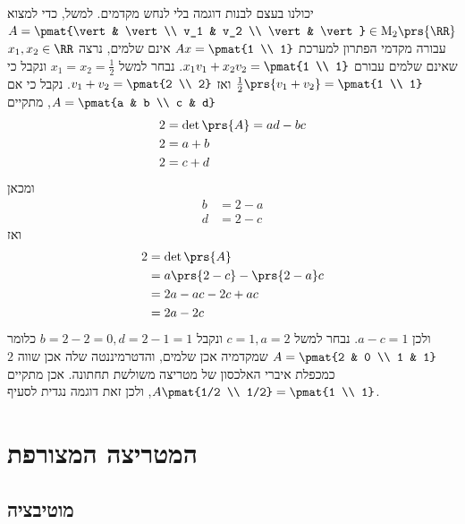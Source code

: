 \documentclass[a4paper,10pt,twoside,openany]{book}
\renewcommand{\Mat}{\mathrm{M}}
\begin{document}
\begin{solution}
\begin{enumerate}
יכולנו בעצם לבנות דוגמה בלי לנחש מקדמים. למשל, כדי למצוא
$A = \pmat{\vert & \vert \\ v_1 & v_2 \\ \vert & \vert} \in \Mat_2\prs{\RR}$
עבורה מקדמי הפתרון למערכת
$Ax = \pmat{1 \\ 1}$
אינם שלמים, נרצה
$x_1, x_2 \in \RR$
שאינם שלמים
עבורם
$x_1 v_1 + x_2 v_2 = \pmat{1 \\ 1}$.
נבחר למשל
$x_1 = x_2 = \frac{1}{2}$
ונקבל כי
$\frac{1}{2} \prs{v_1 + v_2} = \pmat{1 \\ 1}$
ואז
$v_1 + v_2 = \pmat{2 \\ 2}$.
נקבל כי אם
$A = \pmat{a & b \\ c & d}$,
מתקיים
\begin{align*}
2 &= \det\prs{A} = ad - bc \\
2 &= a + b \\
2 &= c + d
\end{align*}
ומכאן
\begin{align*}
b &= 2 - a \\
d &= 2 - c
\end{align*}
ואז
\begin{align*}
2 &= \det\prs{A}
\\&= a \prs{2-c} - \prs{2-a}c
\\&= 2a - ac - 2c + ac
\\&= 2a - 2c
\end{align*}
ולכן
$a-c = 1$.
נבחר למשל
$c = 1, a = 2$
ונקבל
$b = 2 - 2 = 0, d = 2 - 1 = 1$
כלומר
$A = \pmat{2 & 0 \\ 1 & 1}$
שמקדמיה אכן שלמים, והדטרמיננטה שלה אכן שווה
$2$
כמכפלת איברי האלכסון של מטריצה משולשת תחתונה.
אכן מתקיים
$A \pmat{1/2 \\ 1/2} = \pmat{1 \\ 1}$,
ולכן זאת דוגמה נגדית לסעיף.
\end{enumerate}
\end{solution}

\section{המטריצה המצורפת}

\subsection{מוטיבציה}
\end{document}
